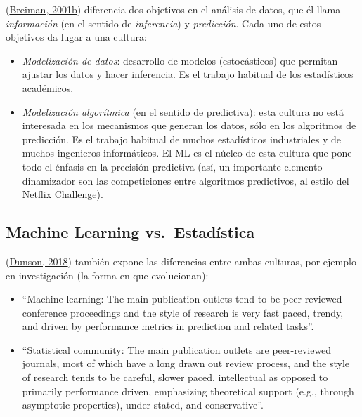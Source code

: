 \documentclass[
]{book}
\theoremstyle{break}
\theoremstyle{nonumberplain}
\begin{document}
(\protect\hyperlink{ref-breiman2001statistical}{Breiman, 2001b}) diferencia dos objetivos en el análisis de datos, que él llama \emph{información} (en el sentido de \emph{inferencia}) y \emph{predicción}.
Cada uno de estos objetivos da lugar a una cultura:

\begin{itemize}
\item
  \emph{Modelización de datos}: desarrollo de modelos (estocásticos) que permitan ajustar los datos y hacer inferencia.
  Es el trabajo habitual de los estadísticos académicos.
\item
  \emph{Modelización algorítmica} (en el sentido de predictiva): esta cultura no está interesada en los mecanismos que generan los datos, sólo en los algoritmos de predicción.
  Es el trabajo habitual de muchos estadísticos industriales y de muchos ingenieros informáticos.
  El ML es el núcleo de esta cultura que pone todo el énfasis en la precisión predictiva (así, un importante elemento dinamizador son las competiciones entre algoritmos predictivos, al estilo del \href{https://en.wikipedia.org/wiki/Netflix_Prize}{Netflix Challenge}).
\end{itemize}

\hypertarget{machine-learning-vs.-estaduxedstica}{%
\subsection{Machine Learning vs.~Estadística}\label{machine-learning-vs.-estaduxedstica}}

(\protect\hyperlink{ref-dunson2018statistics}{Dunson, 2018}) también expone las diferencias entre ambas culturas, por ejemplo en investigación (la forma en que evolucionan):

\begin{itemize}
\item
  ``Machine learning: The main publication outlets tend to be peer-reviewed conference proceedings and the style of research is very fast paced, trendy, and driven by performance metrics in prediction and related tasks''.
\item
  ``Statistical community: The main publication outlets are peer-reviewed journals, most of which have a long drawn out review process, and the style of research tends to be careful, slower paced, intellectual as opposed to primarily performance driven, emphasizing theoretical support (e.g., through asymptotic properties), under-stated, and conservative''.
\end{itemize}
\end{document}
